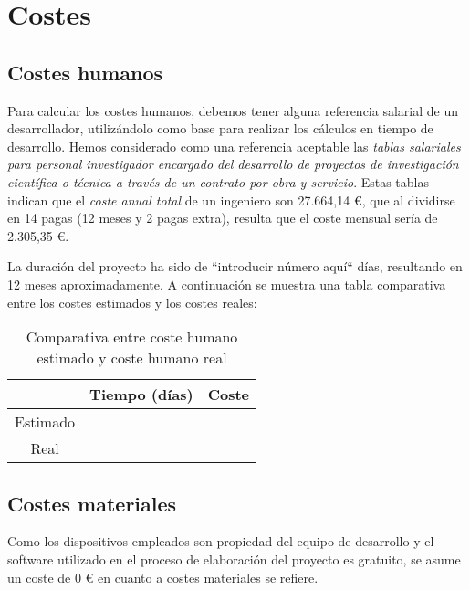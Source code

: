 

\section{Costes}
\subsection{Costes humanos}

Para calcular los costes humanos, debemos tener alguna referencia salarial de un desarrollador, 
utilizándolo como base para realizar los cálculos en tiempo de desarrollo. Hemos considerado como 
una referencia aceptable las \textit{tablas salariales para personal investigador encargado del desarrollo 
de proyectos de investigación científica o técnica a través de un contrato por obra y servicio}.
Estas tablas indican que el \textit{coste anual total} de un ingeniero son 27.664,14 \euro, que al 
dividirse en 14 pagas (12 meses y 2 pagas extra), resulta que el coste mensual sería de 2.305,35 \euro. \medskip

La duración del proyecto ha sido de ``introducir número aquí`` días, resultando en 12 meses aproximadamente.
A continuación se muestra una tabla comparativa entre los costes estimados y los costes reales:

\begin{table}[H]
    \centering
    \begin{tabular}{|c|c|c|}
        \hline 
        & Tiempo (días) & Coste \\
        \hline \hline
        Estimado & & \\ \hline 
        Real & & \\ \hline 
    \end{tabular}
    \caption{Comparativa entre coste humano estimado y coste humano real}
\end{table}


\subsection{Costes materiales}
Como los dispositivos empleados son propiedad del equipo de desarrollo y el software utilizado 
en el proceso de elaboración del proyecto es gratuito, se asume un coste de 0 \euro{} en cuanto a costes materiales
se refiere.
